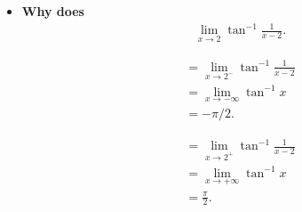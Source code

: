 \documentclass{report}
\begin{document}
\begin{itemize}
    \item \textbf{Why does}
        \begin{align*}
            &\lim\limits_{x \to 2}{\tan^{-1}{\frac{1}{x-2}}} 
        .\end{align*}
        \begin{minipage}[]{0.47\textwidth}
            \begin{align*}
                &=\lim\limits_{x \to 2^{-}}{\tan^{-1}{\frac{1}{x-2}}} \\
                &= \lim\limits_{x \to -\infty}{\tan^{-1}{x}} \\
                &= -\pi/2
            .\end{align*}
        \end{minipage}
        \begin{minipage}[]{0.47\textwidth}
            \begin{align*}
                &=\lim\limits_{x \to 2^{+}}{\tan^{-1}{\frac{1}{x-2}}} \\
                &=\lim\limits_{x \to +\infty}{\tan^{-1}{x}} \\
                &=\frac{\pi}{2}
            .\end{align*}
        \end{minipage}
    \end{itemize}

    \pagebreak \bigbreak \noindent 
\end{document}
